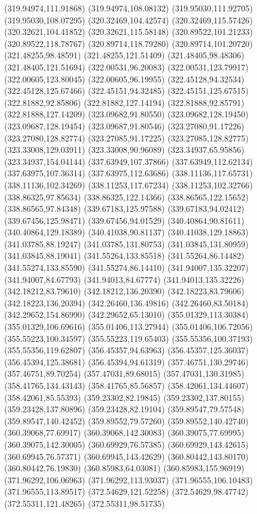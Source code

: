 {(319.94974,111.91868) (319.94974,108.08132) (319.95030,111.92705) (319.95030,108.07295) (320.32469,104.42574) (320.32469,115.57426) (320.32621,104.41852) (320.32621,115.58148)
(320.89522,101.21233) (320.89522,118.78767) (320.89714,118.79280) (320.89714,101.20720) (321.48255,98.48591) (321.48255,121.51409) (321.48405,98.48306) (321.48405,121.51694)
(322.00531,96.20083) (322.00531,123.79917) (322.00605,123.80045) (322.00605,96.19955) (322.45128,94.32534) (322.45128,125.67466) (322.45151,94.32485) (322.45151,125.67515)
(322.81882,92.85806) (322.81882,127.14194) (322.81888,92.85791) (322.81888,127.14209) (323.09682,91.80550) (323.09682,128.19450) (323.09687,128.19454) (323.09687,91.80546)
(323.27080,91.17226) (323.27080,128.82774) (323.27085,91.17225) (323.27085,128.82775) (323.33008,129.03911) (323.33008,90.96089) (323.34937,65.95856) (323.34937,154.04144)
(337.63949,107.37866) (337.63949,112.62134) (337.63975,107.36314) (337.63975,112.63686) (338.11136,117.65731) (338.11136,102.34269) (338.11253,117.67234) (338.11253,102.32766)
(338.86325,97.85634) (338.86325,122.14366) (338.86565,122.15652) (338.86565,97.84348) (339.67183,125.97588) (339.67183,94.02412) (339.67456,125.98471) (339.67456,94.01529)
(340.40864,90.81611) (340.40864,129.18389) (340.41038,90.81137) (340.41038,129.18863) (341.03785,88.19247) (341.03785,131.80753) (341.03845,131.80959) (341.03845,88.19041)
(341.55264,133.85518) (341.55264,86.14482) (341.55274,133.85590) (341.55274,86.14410) (341.94007,135.32207) (341.94007,84.67793) (341.94013,84.67774) (341.94013,135.32226)
(342.18212,83.79610) (342.18212,136.20390) (342.18223,83.79606) (342.18223,136.20394) (342.26460,136.49816) (342.26460,83.50184) (342.29652,154.86990) (342.29652,65.13010)
(355.01329,113.30384) (355.01329,106.69616) (355.01406,113.27944) (355.01406,106.72056) (355.55223,100.34597) (355.55223,119.65403) (355.55356,100.37193) (355.55356,119.62807)
(356.45357,94.63963) (356.45357,125.36037) (356.45394,125.38681) (356.45394,94.61319) (357.46751,130.29746) (357.46751,89.70254) (357.47031,89.68015) (357.47031,130.31985)
(358.41765,134.43143) (358.41765,85.56857) (358.42061,134.44607) (358.42061,85.55393) (359.23302,82.19845) (359.23302,137.80155) (359.23428,137.80896) (359.23428,82.19104)
(359.89547,79.57548) (359.89547,140.42452) (359.89552,79.57260) (359.89552,140.42740) (360.39068,77.69917) (360.39068,142.30083) (360.39075,77.69995) (360.39075,142.30005)
(360.69929,76.57385) (360.69929,143.42615) (360.69945,76.57371) (360.69945,143.42629) (360.80442,143.80170) (360.80442,76.19830) (360.85983,64.03081) (360.85983,155.96919)
(371.96292,106.06963) (371.96292,113.93037) (371.96555,106.10483) (371.96555,113.89517) (372.54629,121.52258) (372.54629,98.47742) (372.55311,121.48265) (372.55311,98.51735)
}
